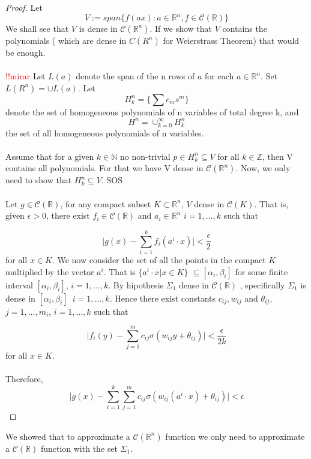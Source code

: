 \documentclass[../main.tex]{subfiles}
\begin{document}
	\begin{proof} %
			Let $$V:= span\{ f(ax) : a \in \mathbb{R}^n, f \in \mathcal{C}(\mathbb{R}) \}$$ We shall see that $V$ is dense in $\mathcal{C}(\mathbb{R}^n)$.  If we show that $V$ contains the polynomials ( which are dense in $C(R^n)$ for Weierstrass Theorem) that would be enough. \\ \\  
			\textcolor{red}{!!mirar}
			Let $L(a)$ denote the span of the n rows of $a$ for each $a\in \mathbb{R}^n$. Set $L(R^n) = \cup L(a)$. Let $$H_k^n= \{ \sum c_m s^m \}$$  denote the set of homogeneous polynomials of n variables of total degree k, and $$H^n= \cup_{k=0}^\infty H_k^n$$ the set of all homogeneous polynomials of n variables. \\  \\ 
			Assume that for a given $k\in \mathbb{N}$ no non-trivial $p\in H_k^n \subseteq V$ for all $k\in \mathbb{Z}$, then V contains all polynomials. For that we have V dense in $\mathcal{C}(\mathbb{R}^n)$. Now, we only need to show that $H_k^n \subseteq  V$. SOS
			\\ \\
			Let $g\in \mathcal{C}(\mathbb{R}) $, for any compact subset $K \subset \mathbb{R}^n  $, $V$ dense in $\mathcal{C}(K)$. That is, given $\epsilon >0$, there exist $f_i\in  \mathcal{C}(\mathbb{R})$ and $a_i \in \mathbb{R}^n $    {\scriptsize $i=1,...,k$}  such that
			
			$$ \big| g(x)-\sum_{i=1}^k f_i(a^i \cdot x) \big| < \frac{\epsilon}{2}$$
			for all $x\in K$. We now consider the set of all the points in the compact $K$ multiplied by the vector $a^i$. That is $\{a^i \cdot x | x \in K\}$ $\subseteq[\alpha_i,\beta_i] $ for some finite interval $[\alpha_i,\beta_i]$, $i=1,...,k$. By hipothesis $\Sigma_1 $ dense in $\mathcal{C}(\mathbb{R})$ , specifically $\Sigma_1 $ is dense in $[\alpha_i,\beta_i ]$ $ \, i=1,...,k$. Hence there exist constants $c_{ij}, w_{ij}$ and $\theta_{ij}$, $j=1,...,m_i$, $i=1,...,k$ such that 
			
			$$ \big| f_i(y) - \sum_{j=1}^{m} c_{ij} \sigma(w_{ij}y+ \theta_{ij})\big| < \frac{\epsilon}{2k}$$
			for all $x\in K$. \\ \\
			Therefore, 
			$$ \big| g(x) - \sum_{i=1}^k \sum_{j=1}^m c_{ij} \sigma(w_{ij}(a^i \cdot x) + \theta_{ij})  \big| < \epsilon$$
		\end{proof}
	We showed that to approximate a $\mathcal{C}(\mathbb{R}^n)$ function we only need to approximate a $\mathcal{C} (\mathbb{R})$ function with the set $\Sigma_1$. 
\end{document}
